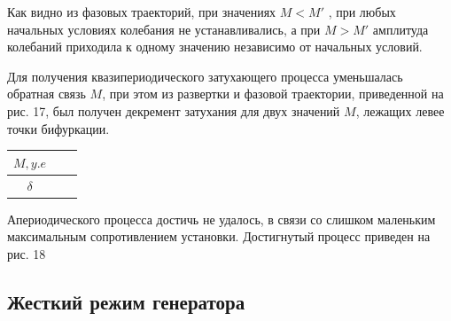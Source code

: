 Как видно из фазовых траекторий, при значениях $M < M'$ , при любых начальных условиях колебания не устанавливались, а при 
$M > M'$ амплитуда колебаний приходила к одному значению независимо от начальных условий.

Для получения квазипериодического затухающего процесса уменьшалась обратная связь $M$, при этом из развертки и фазовой траектории, приведенной на рис. 17, 
был получен декремент затухания для двух значений $M$, лежащих левее точки бифуркации.

\begin{table}[H]
    \centering
    \begin{tabular}{@{}|c|c|c|@{}}
    \hline
        $M, y.e$     &  &  \\ \hline
    $\delta$ &  &  \\ \hline
    \end{tabular}
\end{table}

Апериодического процесса достичь не удалось, в связи со слишком маленьким максимальным сопротивлением установки. Достигнутый процесс приведен на рис. 18
\subsection{Жесткий режим генератора}

